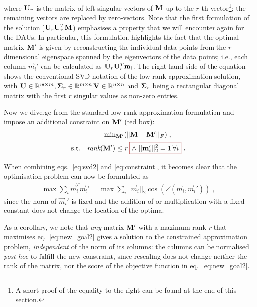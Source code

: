 where $\mat U_r$ is the matrix of left singular vectors of $\mat m$ up to the $r$-th vector\footnote{A short proof of the equality to the right can be found at the end of this section.}; the remaining vectors are replaced by zero-vectors. Note that the first formulation of the solution ($\mat u_r\mat u_r^T\mat m $) 
emphasises a property that we will encounter again for the DAUs. In particular, this formulation highlights the fact that the optimal matrix $\mat m'$ is given by reconstructing the individual data points from the $r$-dimensional eigenspace spanned by the eigenvectors of the data points; i.e., each column $\vec m_i'$ can be calculated as $\mat u_r\mat u_r^T\vec m_i$.
The right hand side of the equation shows the conventional SVD-notation of the low-rank approximation solution, with $\mat u\in \mathbb R^{m\times m}, \mat \Sigma_r \in \mathbb R^{m\times n}\, \mat V \in \mathbb R^{n\times n}$ and $\mat \Sigma_r$ being a rectangular diagonal matrix with the first $r$ singular values as non-zero entries.


Now we diverge from the standard low-rank approximation formulation and impose an additional constraint on $\mat m'$ (red box):
\newcommand{\mycbox}[1]{%
\colorlet{oldcolor}{.}
  {\color[RGB]{150, 0, 0}
  \boxed{\color{oldcolor}#1}}
}
\begin{align}
    &\textstyle\min_{\mat M'}(||\mat M-\mat M'||_F)\;\text{,}\\
    \text{s.t.}\quad \textit{rank}(&\mat m')  \leq r \;\mycbox{\land\; ||\vec m_i'||_2^2 = 1 \;\forall i}\;\textbf{.}
    \label{eq:constraint}
\end{align}


When combining eqs.~\eqref{eq:svd2} and \eqref{eq:constraint}, it becomes clear that the optimisation problem can now be formulated as 
\begin{align}
    \textstyle\max\sum_i{\vec m}_i^T\vec m_i' = \max\sum_i||\vec m_i||_2\cos \left(\angle(\vec m_i,\vec m_i')\right)\; ,
    \label{eq:new_goal2}
\end{align}
since the norm of $\vec m_i'$ is fixed and the addition of or multiplication with a fixed constant does not change the location of the optima.

As a corollary, we note that \emph{any} matrix $\mat m'$ with a maximum rank $r$ that maximises eq.~\eqref{eq:new_goal2} gives a solution to the constrained approximation problem, \emph{independent} of the norm of its columns: the columns can be normalised \emph{post-hoc} to fulfill the new constraint, since rescaling does not change neither the rank of the matrix, nor the score of the objective function in eq.~\eqref{eq:new_goal2}.

